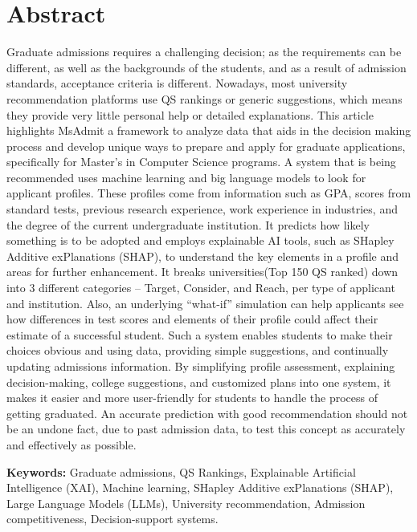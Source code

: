 \vspace{1in}
\chapter*{Abstract}

\justify
Graduate admissions requires a challenging decision; as the requirements can be different, as well as the backgrounds of the students, and as a result of admission standards, acceptance criteria is different. Nowadays, most university recommendation platforms use QS rankings or generic suggestions, which means they provide very little personal help or detailed explanations. This article highlights MsAdmit a framework to analyze data that aids in the decision making process and develop unique ways to prepare and apply for graduate applications, specifically for Master’s in Computer Science programs. A system that is being recommended uses machine learning and big language models to look for applicant profiles. These profiles come from information such as GPA, scores from standard tests, previous research experience, work experience in industries, and the degree of the current undergraduate institution. It predicts how likely something is to be adopted and employs explainable AI tools, such as SHapley Additive exPlanations (SHAP), to understand the key elements in a profile and areas for further enhancement. It breaks universities(Top 150 QS ranked) down into 3 different categories – Target, Consider, and Reach, per type of applicant and institution. Also, an underlying “what-if” simulation can help applicants see how differences in test scores and elements of their profile could affect their estimate of a successful student. Such a system enables students to make their choices obvious and using data, providing simple suggestions, and continually updating admissions information. By simplifying profile assessment, explaining decision-making, college suggestions, and customized plans into one system, it makes it easier and more user-friendly for students to handle the process of getting graduated. An accurate prediction with good recommendation should not be an undone fact, due to past admission data, to test this concept as accurately and effectively as possible.


\vspace{25pt}
\textbf{Keywords:} Graduate admissions, QS Rankings, Explainable Artificial Intelligence (XAI), Machine learning, SHapley Additive exPlanations (SHAP), Large Language Models (LLMs), University recommendation, Admission competitiveness, Decision-support systems.